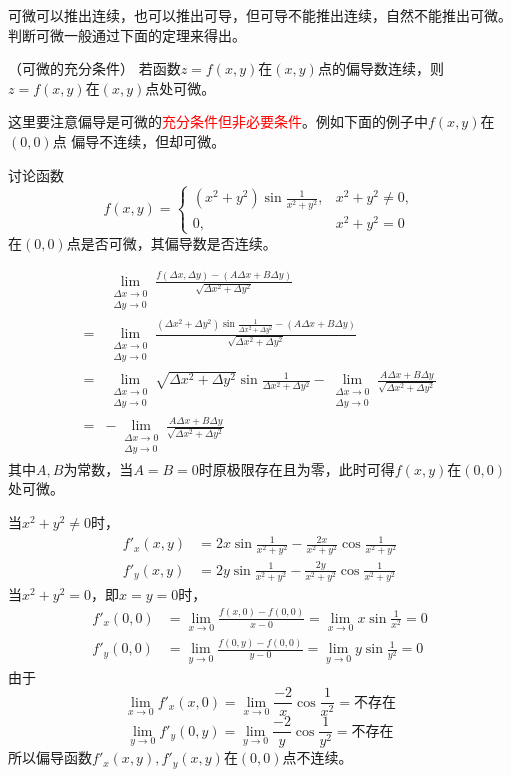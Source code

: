 可微可以推出连续，也可以推出可导，但可导不能推出连续，自然不能推出可微。判断可微一般通过下面的定理来得出。
\begin{theorem}
    （可微的充分条件）
    \label{th:可微的充分条件}
    若函数$z=f(x,y)$在$(x,y)$点的偏导数连续，则$z=f(x,y)$在$(x,y)$点处可微。
\end{theorem}
这里要注意偏导是可微的\textcolor{red}{充分条件但非必要条件}。例如下面的例子中$f(x,y)$在$(0,0)$点
偏导不连续，但却可微。
\begin{example}
    讨论函数
    \[
        f(x,y) =
        \begin{cases}
            (x^2+y^2)\sin \frac{1}{x^2+y^2}, & x^2+y^2 \neq 0, \\
            0,                               & x^2+y^2=0
        \end{cases}
    \]
    在$(0,0)$点是否可微，其偏导数是否连续。
\end{example}
\begin{solution}
    \begin{align*}
          & \lim_{\substack{\Delta x\to 0  \\ \Delta y \to 0}} \frac{f(\Delta x, \Delta y)-(A\Delta x+ B\Delta y)}{\sqrt{\Delta x^2 + \Delta y^2}}\\
        = & \lim_{\substack{\Delta x\to 0  \\ \Delta y \to 0}} \frac{(\Delta x^2+\Delta y^2)\sin \frac{1}{\Delta x^2+\Delta y^2} - (A\Delta x + B \Delta y)}{\sqrt{\Delta x^2 + \Delta y^2}}\\
        = & \lim_{\substack{\Delta x\to 0  \\ \Delta y \to 0}} \sqrt{\Delta x^2 + \Delta y^2}\sin \frac{1}{\Delta x^2 +\Delta y^2} - \lim_{\substack{\Delta x\to 0 \\ \Delta y \to 0}} \frac{A\Delta x + B\Delta y}{\sqrt{\Delta x^2 + \Delta y^2}}\\
        = & -\lim_{\substack{\Delta x\to 0 \\ \Delta y \to 0}} \frac{A\Delta x + B\Delta y}{\sqrt{\Delta x^2 + \Delta y^2}}
    \end{align*}
    其中$A,B$为常数，当$A=B=0$时原极限存在且为零，此时可得$f(x,y)$在$(0,0)$处可微。

    当$ x^2+y^2 \neq 0$时，
    \begin{align*}
        f'_x(x,y) & = 2x\sin\frac{1}{x^2+y^2} -\frac{2x}{x^2+y^2}\cos\frac{1}{x^2+y^2} \\
        f'_y(x,y) & = 2y\sin\frac{1}{x^2+y^2} -\frac{2y}{x^2+y^2}\cos\frac{1}{x^2+y^2}
    \end{align*}
    当$x^2+y^2=0$，即$x=y=0$时，
    \begin{align*}
        f'_x(0,0) & = \lim_{x\to 0} \frac{f(x,0)-f(0,0)}{x-0} = \lim_{x\to 0}x\sin\frac{1}{x^2} = 0 \\
        f'_y(0,0) & = \lim_{y\to 0} \frac{f(0,y)-f(0,0)}{y-0} = \lim_{y\to 0}y\sin\frac{1}{y^2} = 0
    \end{align*}
    由于
    \[ \lim_{x\to 0} f'_x(x,0) = \lim_{x\to 0}\frac{-2}{x}\cos\frac{1}{x^2} = \text{不存在} \]
    \[ \lim_{y\to 0} f'_y(0,y) = \lim_{y\to 0}\frac{-2}{y}\cos\frac{1}{y^2} = \text{不存在} \]
    所以偏导函数$f'_x(x,y),f'_y(x,y)$在$(0,0)$点不连续。
\end{solution}

